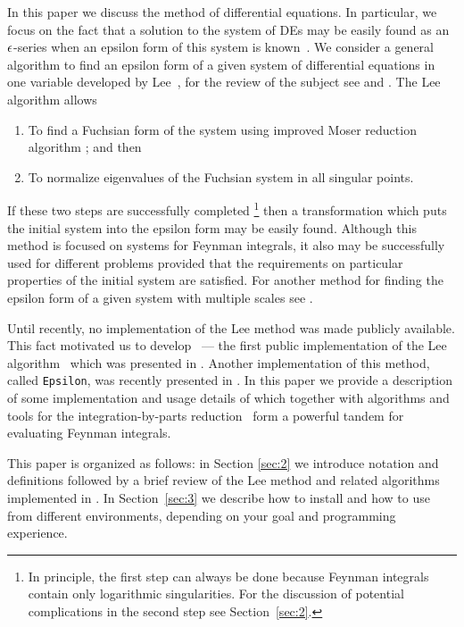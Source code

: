 \documentclass[12pt,a4paper]{article}
\begin{document}
In this paper we discuss the method of differential equations.
In particular, we focus on the fact that a solution to the system of DEs may be easily found as an $\epsilon$-series when an epsilon form of this system is known~\cite{Henn13}.
We consider a general algorithm to find an epsilon form of a given system of differential equations in one variable developed by Lee~\cite{Lee15}, for the review of the subject see \cite{Henn14} and \cite{Pap14,Tan15,ABB15}.
The Lee algorithm allows
\begin{enumerate}
  \item To find a Fuchsian form of the system using improved Moser reduction algorithm \cite{Mos59}; and then
  \item To normalize eigenvalues of the Fuchsian system in all singular points.
\end{enumerate}
If these two steps are successfully completed%
\footnote{In principle, the first step can always be done because Feynman integrals contain only logarithmic singularities. For the discussion of potential complications in the second step see Section~\ref{sec:2}.}
then a transformation which puts the initial system into the epsilon form may be easily found.
Although this method is focused on systems for Feynman integrals, it also may be successfully used for different problems provided that the requirements on particular properties of the initial system are satisfied.
For another method for finding the epsilon form of a given system with multiple scales see \cite{Mey16a,Mey16b}.

Until recently, no implementation of the Lee method was made publicly available.
This fact motivated us to develop \fuchsia \ --- the first public implementation of the Lee algorithm~\cite{Lee15} which was presented in \cite{GM16}.
Another implementation of this method, called \texttt{Epsilon}, was recently presented in \cite{Pra17}.
In this paper we provide a description of some implementation and usage details of \fuchsia which together with algorithms and tools for the integration-by-parts reduction~\cite{Lap00,Smi08,MS12,Lee12,Lee13,SS13,Smi14,GLZ16} form a powerful tandem for evaluating Feynman integrals.

This paper is organized as follows: in Section \ref{sec:2} we introduce notation and definitions followed by a brief review of the Lee method and related algorithms implemented in \fuchsia.
In Section~\ref{sec:3} we describe how to install and how to use \fuchsia from different environments, depending on your goal and programming experience.
\end{document}
